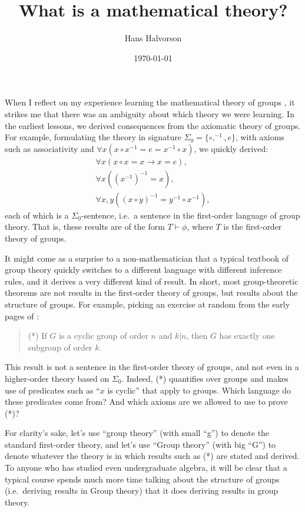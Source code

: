 \documentclass[12pt,fleqn]{article}
\title{What is a mathematical theory?}
\author{Hans Halvorson}
\date{\today}
\begin{document}
\maketitle





When I reflect on my experience learning the mathematical theory of
groups \citep[see][]{hungerford}, it strikes me that there was an
ambiguity about which theory we were learning. In the earliest
lessons, we derived consequences from the axiomatic theory of
groups. For example, formulating the theory in signature
$\Sigma _0=\{ \circ ,^{-1},e\}$, with axioms such as associativity and
$\forall x(x\circ x^{-1}=e=x^{-1}\circ x)$, we quickly derived:
\[ \begin{array}{ll}
     \forall x(x\circ x=x\to x=e ) ,\\
     \forall x((x^{-1})^{-1}=x), \\
     \forall x,y((x\circ y)^{-1}=y^{-1}\circ x^{-1}) ,\end{array}
\]
each of which is a $\Sigma _0$-sentence, i.e.\ a sentence in the
first-order language of group theory. That is, these results are of
the form $T\vdash\phi$, where $T$ is the first-order theory of groups.

It might come as a surprise to a non-mathematician that a typical
textbook of group theory quickly switches to a different language with
different inference rules, and it derives a very different kind of
result. In short, most group-theoretic theorems are not results in the
first-order theory of groups, but results about the structure of
groups. For example, picking an exercise at random from the early
pages of \citep{hungerford}:
\begin{quote} (*) If $G$ is a cyclic group of order $n$ and $k|n$,
  then $G$ has exactly one subgroup of order $k$. \end{quote} This
result is not a sentence in the first-order theory of groups, and not
even in a higher-order theory based on $\Sigma _0$. Indeed, (*)
quantifies over groups and makes use of predicates such as ``$x$ is
cyclic'' that apply to groups. Which language do these predicates come
from? And which axioms are we allowed to use to prove (*)?

For clarity's sake, let's use ``group theory'' (with small ``g'') to
denote the standard first-order theory, and let's use ``Group theory''
(with big ``G'') to denote whatever the theory is in which results
such as (*) are stated and derived. To anyone who has studied even
undergraduate algebra, it will be clear that a typical course spends
much more time talking about the structure of groups (i.e.\ deriving
results in Group theory) that it does deriving results in group
theory.
\end{document}
